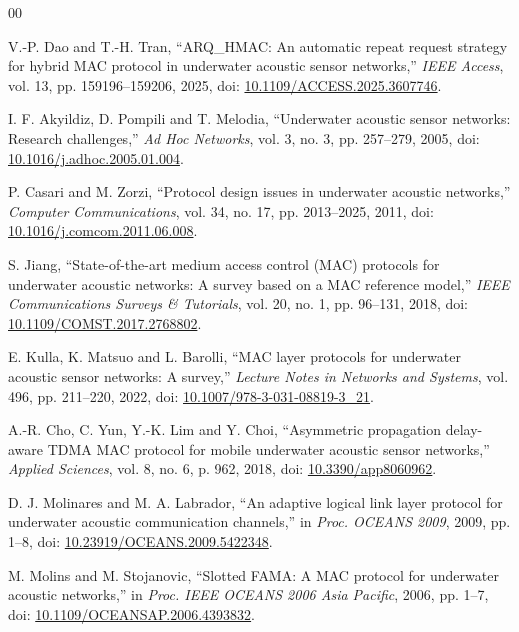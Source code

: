 \documentclass{article}
\begin{document}
\begin{thebibliography}{00}

V.-P. Dao and T.-H. Tran,
``ARQ\_HMAC: An automatic repeat request strategy for hybrid MAC protocol in underwater acoustic sensor networks,''
\textit{IEEE Access}, vol. 13, pp. 159196--159206, 2025, doi: \href{https://doi.org/10.1109/ACCESS.2025.3607746}{10.1109/ACCESS.2025.3607746}.

I. F. Akyildiz, D. Pompili and T. Melodia,
``Underwater acoustic sensor networks: Research challenges,''
\textit{Ad Hoc Networks}, vol. 3, no. 3, pp. 257--279, 2005, doi: \href{https://doi.org/10.1016/j.adhoc.2005.01.004}{10.1016/j.adhoc.2005.01.004}.

P. Casari and M. Zorzi,
``Protocol design issues in underwater acoustic networks,''
\textit{Computer Communications}, vol. 34, no. 17, pp. 2013--2025, 2011, doi: \href{https://doi.org/10.1016/j.comcom.2011.06.008}{10.1016/j.comcom.2011.06.008}.

S. Jiang,
``State-of-the-art medium access control (MAC) protocols for underwater acoustic networks: A survey based on a MAC reference model,''
\textit{IEEE Communications Surveys \& Tutorials}, vol. 20, no. 1, pp. 96--131, 2018, doi: \href{https://doi.org/10.1109/COMST.2017.2768802}{10.1109/COMST.2017.2768802}.

E. Kulla, K. Matsuo and L. Barolli,
``MAC layer protocols for underwater acoustic sensor networks: A survey,''
\textit{Lecture Notes in Networks and Systems}, vol. 496, pp. 211--220, 2022, doi: \href{https://doi.org/10.1007/978-3-031-08819-3_21}{10.1007/978-3-031-08819-3\_21}.

A.-R. Cho, C. Yun, Y.-K. Lim and Y. Choi,
``Asymmetric propagation delay-aware TDMA MAC protocol for mobile underwater acoustic sensor networks,''
\textit{Applied Sciences}, vol. 8, no. 6, p. 962, 2018, doi: \href{https://doi.org/10.3390/app8060962}{10.3390/app8060962}.

D. J. Molinares and M. A. Labrador,
``An adaptive logical link layer protocol for underwater acoustic communication channels,''
in \textit{Proc. OCEANS 2009}, 2009, pp. 1--8, doi: \href{https://doi.org/10.23919/OCEANS.2009.5422348}{10.23919/OCEANS.2009.5422348}.

M. Molins and M. Stojanovic,
``Slotted FAMA: A MAC protocol for underwater acoustic networks,''
in \textit{Proc. IEEE OCEANS 2006 Asia Pacific}, 2006, pp. 1--7, doi: \href{https://doi.org/10.1109/OCEANSAP.2006.4393832}{10.1109/OCEANSAP.2006.4393832}.


\end{thebibliography}
\end{document}
